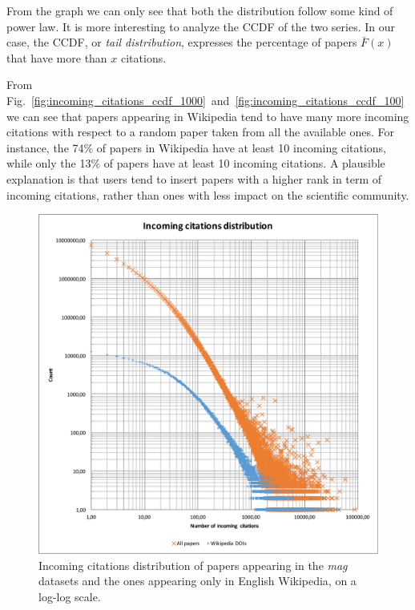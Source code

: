 From the graph we can only see that both the distribution follow some kind of power law.
It is more interesting to analyze the \ac{CCDF} of the two series.
In our case, the \ac{CCDF}, or \emph{tail distribution}, expresses the percentage of papers $\bar{F}(x)$ that have more than $x$ citations.

From Fig.~\ref{fig:incoming_citations_ccdf_1000}~and~\ref{fig:incoming_citations_ccdf_100} we can see that papers appearing in Wikipedia tend to have many more incoming citations with respect to a random paper taken from all the available ones.
For instance, the 74\% of papers in Wikipedia have at least 10 incoming citations, while only the 13\% of papers have at least 10 incoming citations.
A plausible explanation is that users tend to insert papers with a higher rank in term of incoming citations, rather than ones with less impact on the scientific community.


\begin{figure}[h]
\centering
\includegraphics[keepaspectratio=true, width=\textwidth]{assets/incoming_cits_loglog}
\caption{Incoming citations distribution of papers appearing in the \emph{mag} datasets and the ones appearing only in English Wikipedia, on a log-log scale.}
\label{fig:incoming_citations_loglog}
\end{figure}

